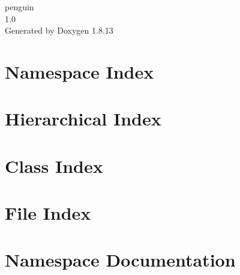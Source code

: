 \documentclass[twoside]{book}
\newcommand{\+}{\discretionary{\mbox{\scriptsize$\hookleftarrow$}}{}{}}
\newcommand{\clearemptydoublepage}{%
  \newpage{\pagestyle{empty}\cleardoublepage}%
}
\begin{document}
\hypersetup{pageanchor=false,
             bookmarksnumbered=true,
             pdfencoding=unicode
            }
\begin{titlepage}
\vspace*{7cm}
\begin{center}%
{\Large penguin \\[1ex]\large 1.\+0 }\\
\vspace*{1cm}
{\large Generated by Doxygen 1.8.13}\\
\end{center}
\end{titlepage}
\clearemptydoublepage
{}
\tableofcontents
\clearemptydoublepage
{}
\hypersetup{pageanchor=true}

\chapter{Namespace Index}

\chapter{Hierarchical Index}

\chapter{Class Index}

\chapter{File Index}

\chapter{Namespace Documentation}








\end{document}
